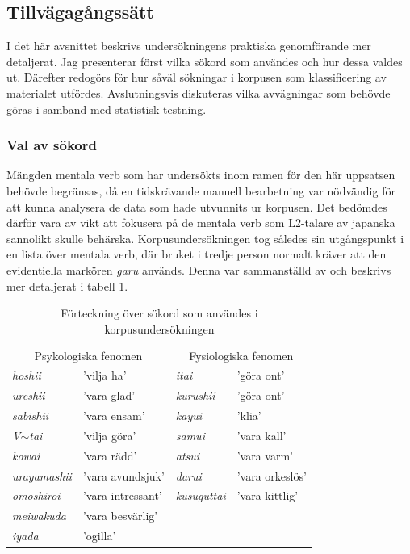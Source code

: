\documentclass[12pt,a4paper]{article}
\begin{document}
\subsection{Tillvägagångssätt}
\label{sec:Undersökningen: Tillvägagångssätt}
I det här avsnittet beskrivs undersökningens praktiska genomförande mer detaljerat. Jag presenterar först vilka sökord som användes och hur dessa valdes ut. Därefter redogörs för hur såväl sökningar i korpusen som klassificering av materialet utfördes. Avslutningsvis diskuteras vilka avvägningar som behövde göras i samband med statistisk testning.

\subsubsection{Val av sökord}
\label{subsec:Undersökningen: Tillvägagångssätt: Val av sökord}
Mängden mentala verb som har undersökts inom ramen för den här uppsatsen behövde begränsas, då en tidskrävande manuell bearbetning var nödvändig för att kunna analysera de data som hade utvunnits ur korpusen. Det bedömdes därför vara av vikt att fokusera på de mentala verb som L2-talare av japanska sannolikt skulle behärska. Korpusundersökningen tog således sin utgångspunkt i en lista över mentala verb, där bruket i tredje person normalt kräver att den evidentiella markören \emph{garu} används. Denna var sammanställd av \textcite[125--126]{makino1986} och beskrivs mer detaljerat i tabell \ref{tab:Förteckning över sökord}.

\begin{table}[h]
\caption{Förteckning över sökord som användes i korpusundersökningen}
\label{tab:Förteckning över sökord}
\begin{tabular}{llll}
\toprule
\multicolumn{2}{c}{Psykologiska fenomen} & \multicolumn{2}{c}{Fysiologiska fenomen} \\
\cmidrule(rl){1-2} \cmidrule(rl){3-4}
\emph{hoshii}       & 'vilja ha'        &    \emph{itai}         &    'göra ont'      \\
\emph{ureshii}      & 'vara glad'       &    \emph{kurushii}     &    'göra ont'      \\
\emph{sabishii}     & 'vara ensam'      &    \emph{kayui}        &    'klia'          \\
\emph{V$\sim$tai}   & 'vilja göra'      &    \emph{samui}        &    'vara kall'     \\
\emph{kowai}        & 'vara rädd'       &    \emph{atsui}        &    'vara varm'     \\
\emph{urayamashii}  & 'vara avundsjuk'  &    \emph{darui}        &    'vara orkeslös' \\
\emph{omoshiroi}    & 'vara intressant' &    \emph{kusuguttai}   &    'vara kittlig'  \\
\emph{meiwakuda}    & 'vara besvärlig'  &                        &                    \\
\emph{iyada}        & 'ogilla'          &                        &                    \\
\bottomrule
\end{tabular}
\end{table}
\end{document}
